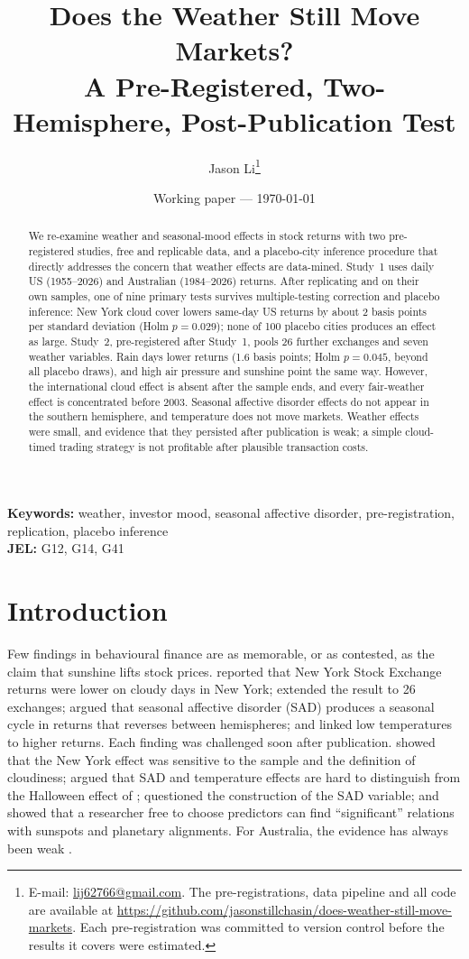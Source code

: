 \documentclass[11pt]{article}
\title{Does the Weather Still Move Markets?\\[4pt]
\large A Pre-Registered, Two-Hemisphere, Post-Publication Test}
\author{Jason Li\thanks{E-mail: \href{mailto:lij62766@gmail.com}{lij62766@gmail.com}. The
pre-registrations, data pipeline and all code are available at \url{https://github.com/jasonstillchasin/does-weather-still-move-markets}. Each
pre-registration was committed to version control before the results it covers were estimated.}}
\date{Working paper --- \today}
\begin{document}
\maketitle

\begin{abstract}
\noindent
We re-examine weather and seasonal-mood effects in stock returns with two pre-registered studies,
free and replicable data, and a placebo-city inference procedure that directly addresses the
concern that weather effects are data-mined. Study~1 uses daily US (1955--2026) and Australian
(1984--2026) returns. After replicating \citet{hirshleifer2003} and \citet{kamstra2003} on their
own samples, one of nine primary tests survives multiple-testing correction and placebo inference:
New York cloud cover lowers same-day US returns by about 2 basis points per standard deviation
(Holm $p=0.029$); none of 100 placebo cities produces an effect as large. Study~2, pre-registered after
Study~1, pools 26 further exchanges and seven weather variables. Rain days lower returns (1.6 basis
points; Holm $p=0.045$, beyond all placebo draws), and high air pressure and sunshine point the same
way. However, the international cloud effect is absent after the \citet{hirshleifer2003} sample
ends, and every fair-weather effect is concentrated before 2003. Seasonal affective disorder
effects do not appear in the southern hemisphere, and temperature does not move markets. Weather
effects were small, and evidence that they persisted after publication is weak; a simple
cloud-timed trading strategy is not profitable after plausible transaction costs.
\end{abstract}

\noindent\textbf{Keywords:} weather, investor mood, seasonal affective disorder, pre-registration,
replication, placebo inference\\
\textbf{JEL:} G12, G14, G41

\newpage
\section{Introduction}

Few findings in behavioural finance are as memorable, or as contested, as the claim that sunshine
lifts stock prices. \citet{saunders1993} reported that New York Stock Exchange returns were lower
on cloudy days in New York; \citet{hirshleifer2003} extended the result to 26 exchanges;
\citet{kamstra2003} argued that seasonal affective disorder (SAD) produces a seasonal cycle in
returns that reverses between hemispheres; and \citet{cao2005} linked low temperatures to higher
returns. Each finding was challenged soon after publication. \citet{trombley1997} showed that the
New York effect was sensitive to the sample and the definition of cloudiness;
\citet{jacobsen2008} argued that SAD and temperature effects are hard to distinguish from the
Halloween effect of \citet{bouman2002}; \citet{kelly2010} questioned the construction of the SAD
variable; and \citet{novymarx2014} showed that a researcher free to choose predictors can find
``significant'' relations with sunspots and planetary alignments. For Australia, the evidence has
always been weak \citep{keef2007,worthington2009}.
\end{document}

